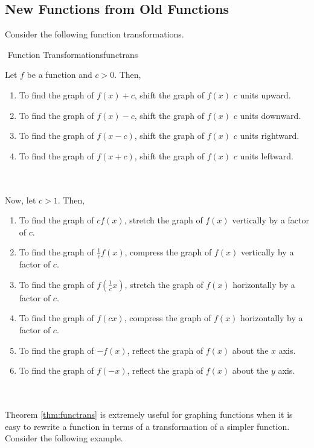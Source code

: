	\pagebreak
	
	\subsection{New Functions from Old Functions}

		Consider the following function transformations.
		\begin{theorem}{\Stop\,\,Function Transformations}{functrans}
			
			Let \(f\) be a function and \(c>0\). Then,
			\begin{enumerate}
				\item To find the graph of \(f(x)+c\), shift the graph of \(f(x)\) \(c\) units upward.
				\item To find the graph of \(f(x)-c\), shift the graph of \(f(x)\) \(c\) units downward.
				\item To find the graph of \(f(x-c)\), shift the graph of \(f(x)\) \(c\) units rightward.
				\item To find the graph of \(f(x+c)\), shift the graph of \(f(x)\) \(c\) units leftward.
			\end{enumerate}
			\vphantom
			\\
			\\
			Now, let \(c>1\). Then,
			\begin{enumerate}
				\item To find the graph of \(cf(x)\), stretch the graph of \(f(x)\) vertically by a factor of \(c\).
				\item To find the graph of \(\frac{1}{c}f(x)\), compress the graph of \(f(x)\) vertically by a factor of \(c\).
				\item To find the graph of \(f\left(\frac{1}{c}x\right)\), stretch the graph of \(f(x)\) horizontally by a factor of \(c\).
				\item To find the graph of \(f(cx)\), compress the graph of \(f(x)\) horizontally by a factor of \(c\).
				\item To find the graph of \(-f(x)\), reflect the graph of \(f(x)\) about the \(x\) axis.
				\item To find the graph of \(f(-x)\), reflect the graph of \(f(x)\) about the \(y\) axis.
			\end{enumerate}

		\end{theorem}
		\pagebreak
		\vphantom
		\\
		\\
		Theorem \ref{thm:functrans} is extremely useful for graphing functions when it is easy to rewrite a function in terms of a transformation of a simpler function. Consider the following example.
